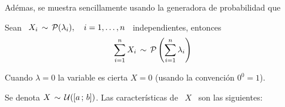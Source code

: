 Ad\'emas, se muestra  sencillamente usando la generadora de  probabilidad que
%
\begin{lema}[Stabilidad]
\label{Lem:MP:StabilidadPoisson}
%
  Sean  \  $X_i  \,  \sim  \,  \P(\lambda_i),  \quad  i  =  1,  \ldots  ,  n$  \
  independientes, entonces
  \[
  \sum_{i=1}^n X_i \, \sim \, \P\left( \sum_{i=1}^n \lambda_i \right)
  \]
\end{lema}

Cuando $\lambda = 0$ la variable es  cierta $X = 0$ (usando la convenci\'on $0^0
= 1$).  





\label{Ssec:MP:EjemplosDistribucionescontinuas}




\label{Sssec:MP:UniformeContinua}

Se denota $X \, \sim \, \U([a \; b])$. Las caracter\'isticas de \ $X$ \ son las
siguientes:

